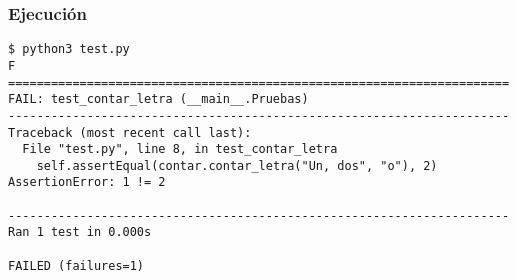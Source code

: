 \begin{frame}[fragile]
\frametitle{Ejecución}

\begin{verbatim}
$ python3 test.py 
F
======================================================================
FAIL: test_contar_letra (__main__.Pruebas)
----------------------------------------------------------------------
Traceback (most recent call last):
  File "test.py", line 8, in test_contar_letra
    self.assertEqual(contar.contar_letra("Un, dos", "o"), 2)
AssertionError: 1 != 2

----------------------------------------------------------------------
Ran 1 test in 0.000s

FAILED (failures=1)
\end{verbatim}

\end{frame}


